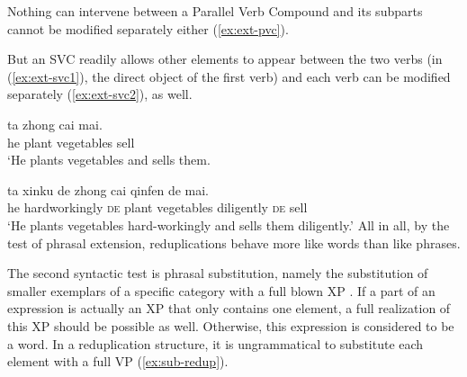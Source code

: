 Nothing can intervene between a Parallel Verb Compound and its subparts cannot be modified separately either (\ref{ex:ext-pvc}).

\ea\label{ex:ext-pvc}
  
  
  
  
  \z
\z

But an {SVC} readily allows other elements to appear between the two verbs (in (\ref{ex:ext-svc1}), the direct object of the first verb) and each verb can be modified separately (\ref{ex:ext-svc2}), as well.

\ea
  \ea\label{ex:ext-svc1}
  \gll ta zhong cai mai.\\
  he plant vegetables sell\\
  \glt `He plants vegetables and sells them.
  
  \ex\label{ex:ext-svc2}
  \gll ta xinku de zhong cai qinfen de mai.\\
  he hardworkingly \textsc{de} plant vegetables diligently \textsc{de} sell\\
  \glt `He plants vegetables hard-workingly and sells them diligently.'
  \z
\z
All in all, by the test of phrasal extension, reduplications behave more like words than like phrases.



The second syntactic test is phrasal substitution, namely the substitution of smaller exemplars of a specific category with a full blown XP \citetext{\citealp[152]{Duanmu1998}; \citealp[280]{Schaefer2009}}. 
If a part of an expression is actually an XP that only contains one element, a full realization of this XP should be possible as well.
Otherwise, this expression is considered to be a word.
In a reduplication structure, it is ungrammatical to substitute each element with a full {VP} (\ref{ex:sub-redup}).

